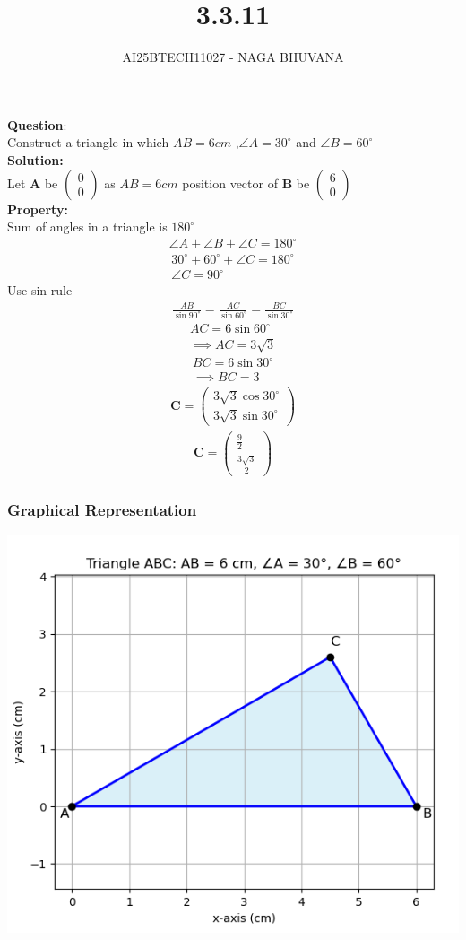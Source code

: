 \documentclass{beamer}
\title{3.3.11}
\author{AI25BTECH11027 - NAGA BHUVANA}
\theoremstyle{remark}
\newcommand{\myvec}[1]{\ensuremath{\begin{pmatrix}#1\end{pmatrix}}}
\let\vec\mathbf
\numberwithin{equation}{section}
\begin{document}
{\let\newpage\relax\maketitle}
\renewcommand{\thefigure}{\theenumi}
\renewcommand{\thetable}{\theenumi}
		\textbf{Question}:\\
		Construct a triangle in which $AB=6cm$ ,$\angle A=30^\circ$ and $\angle B=60^\circ$\\
\textbf{Solution:}\\
Let $\vec{A}$ be $\myvec{0\\0}$ as $AB=6 cm$ position vector of $\vec{B}$ be $\myvec{6\\0}$\\
\textbf{Property:}\\
Sum of angles in a triangle is $180^\circ$\\
\begin{align}
    \angle A+\angle B+\angle C=180^\circ
\end{align}
\begin{align}
    30^\circ+60^\circ+\angle C=180^\circ\\
    \angle C=90^\circ
\end{align}
Use sin rule\\
\begin{align}
    \frac{AB}{\sin 90^\circ}=\frac{AC}{\sin 60^\circ}=\frac{BC}{\sin 30^\circ}
\end{align}
       \begin{align}
           AC=6\sin 60^\circ\\
         \implies  AC=3\sqrt{3}
       \end{align} 
\begin{align}
    BC=6\sin 30^\circ\\
    \implies BC=3
\end{align}
\begin{align}
    \vec{C}=\myvec{3\sqrt{3} \cos 30^\circ\\3\sqrt{3} \sin 30^\circ}
\end{align}       
\begin{align}
    \vec{C}=\myvec{\frac{9}{2}\\ \frac{3\sqrt{3}}{2}}
\end{align}
\frametitle{Graphical Representation}
\centering
\includegraphics[width=0.6\linewidth]{figs/fig1.png}
        
\end{document}

